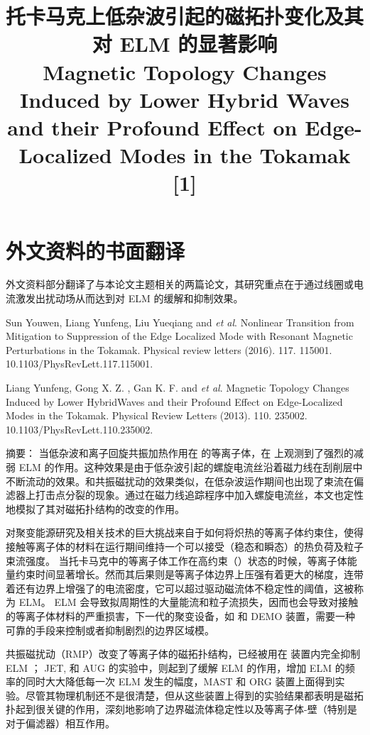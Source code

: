 
\chapter{外文资料的书面翻译}

外文资料部分翻译了与本论文主题相关的两篇论文，其研究重点在于通过线圈或电流激发出扰动场从而达到对 ELM 的缓解和抑制效果。


\begin{translationbib}
  \item Sun Youwen, Liang Yunfeng, Liu Yueqiang and \textit{et al}. Nonlinear Transition from Mitigation to Suppression of the Edge Localized Mode with Resonant Magnetic Perturbations in the \east Tokamak. Physical review letters (2016). 117. 115001. 10.1103/PhysRevLett.117.115001. 
  \item Liang Yunfeng, Gong X. Z. , Gan K. F. and \textit{et al}. Magnetic Topology Changes Induced by Lower HybridWaves and their Profound Effect on Edge-Localized Modes in the \east Tokamak. Physical Review Letters (2013). 110. 235002. 10.1103/PhysRevLett.110.235002. 
\end{translationbib}


\title{\textbf{ \east  托卡马克上低杂波引起的磁拓扑变化及其对 ELM 的显著影响\\Magnetic Topology Changes Induced by Lower Hybrid Waves and their Profound Effect on Edge-Localized Modes in the \east Tokamak} [1]}

{\heiti 摘要：} {\kaishu 当低杂波和离子回旋共振加热作用在 \Hmode 的等离子体，在  \east  上观测到了强烈的减弱 ELM 的作用。这种效果是由于低杂波引起的螺旋电流丝沿着磁力线在刮削层中不断流动的效果。和共振磁扰动的效果类似，在低杂波运作期间也出现了束流在偏滤器上打击点分裂的现象。通过在磁力线追踪程序中加入螺旋电流丝，本文也定性地模拟了其对磁拓扑结构的改变的作用。}



对聚变能源研究及相关技术的巨大挑战来自于如何将炽热的等离子体约束住，使得接触等离子体的材料在运行期间维持一个可以接受（稳态和瞬态）的热负荷及粒子束流强度。
当托卡马克中的等离子体工作在高约束（\Hmode）状态的时候，等离子体能量约束时间显著增长。然而其后果则是等离子体边界上压强有着更大的梯度，连带着还有边界上增强了的电流密度，它可以超过驱动磁流体不稳定性的阈值，这被称为 ELM。 ELM 会导致拟周期性的大量能流和粒子流损失，因而也会导致对接触的等离子体材料的严重损害，下一代的聚变设备，如 \iter 和 DEMO 装置，需要一种可靠的手段来控制或者抑制剧烈的边界区域模。

共振磁扰动（RMP）改变了等离子体的磁拓扑结构，已经被用在 \ddd 装置内完全抑制 ELM ； JET, \mast 和 AUG 的实验中，则起到了缓解 ELM 的作用，增加 ELM 的频率的同时大大降低每一次 ELM 发生的幅度，MAST 和 ORG 装置上面得到实验。尽管其物理机制还不是很清楚，但从这些装置上得到的实验结果都表明是磁拓扑起到很关键的作用，深刻地影响了边界磁流体稳定性以及等离子体-壁（特别是对于偏滤器）相互作用。


